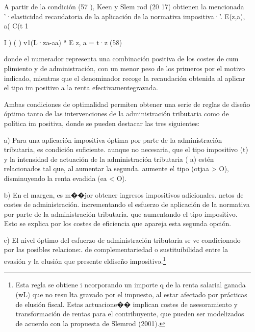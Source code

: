 \documentclass[10pt,a4paper]{article}
\begin{document}
A partir de la condición (57 ), Keen y Slem rod (20 17) obtienen la mencionada '·elasticidad recaudatoria de la aplicación de la normativa impositiva·'. E(z,a),
a( C(t 1 {I ) ( ) v1(L·za-aa) ª E z, a = t·z
(58)

donde el numerador representa una combinación positiva de los costes de cum plimiento y de administración, con un menor peso de los primeros por el motivo indicado, mientras que el denominador recoge la recaudación obtenida al aplicar el tipo im positivo a la renta efectivamentegravada.

Ambas condiciones de optimalidad permiten obtener una serie de reglas de diseño óptimo tanto de las intervenciones de la administración tributaria como de política im positiva, donde se pueden destacar las tres siguientes:

a) Para una aplicación impositiva óptima por parte de la administración tributaria, es condición suficiente. aunque no necesaria, que el tipo impositivo (t) y la intensidad de actuación de la administración tributaria ( a) estén relacionados tal que, al aumentar la segunda. aumente el tipo (otjaa > O), disminuyendo la renta evadida (ea < O).

b) En el margen, es m��jor obtener ingresos impositivos adicionales. netos de costes de administración. incrementando el esfuerzo de aplicación de la normativa por parte de la administración tributaria. que aumentando el tipo impositivo. Esto se explica por los costes de eficiencia que apareja esta segunda opción.

e) El nivel óptimo del esfuerzo de administración tributaria se ve condicionado por las posibles relacione:. de complementariedad o sustituibilidad entre la evasión y la elusión que presente eldiseño impositivo.\footnote{%
    Esta regla se obtiene i ncorporando un importe q de la renta salarial ganada (wL) que no resu lta gravado por el impuesto, al estar afectado por prácticas de elusión fiscal. Estas actuacione�� implican costes de asesoramiento y transformación de rentas para el contribuyente, que pueden ser modelizados de acuerdo con la propuesta de Slemrod (2001).
}














































}
\end{document}
